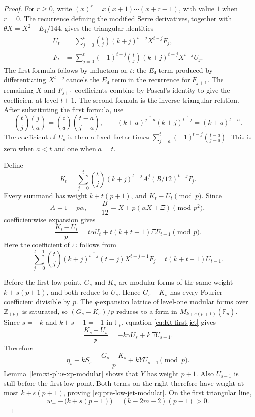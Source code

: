 \begin{proof}
For $r\geq0$, write
$(x)^{\overline r}=x(x+1)\cdots(x+r-1)$, with value $1$ when $r=0$.
The recurrence defining the modified Serre derivatives, together with
$\theta X=X^2-E_4/144$, gives the triangular identities
\begin{align}
 U_t&=\sum_{j=0}^t\binom tj
       (k+j)^{\overline{t-j}}X^{t-j}F_j,\label{eq:modified-serre-forward}\\
 F_t&=\sum_{j=0}^t(-1)^{t-j}\binom tj
       (k+j)^{\overline{t-j}}X^{t-j}U_j.\label{eq:modified-serre-inverse}
\end{align}
The first formula follows by induction on $t$: the $E_4$ term produced by
differentiating $X^{t-j}$ cancels the $E_4$ term in the recurrence for
$F_{j+1}$.  The remaining $X$ and $F_{j+1}$ coefficients combine by
Pascal's identity to give the coefficient at level $t+1$.  The second
formula is the inverse triangular relation.  After substituting the first
formula, use
\[
 \binom tj\binom ja=\binom ta\binom{t-a}{j-a},
 \qquad
 (k+a)^{\overline{j-a}}(k+j)^{\overline{t-j}}
 =(k+a)^{\overline{t-a}}.
\]
The coefficient of $U_a$ is then a fixed factor times
$\sum_{j=a}^t(-1)^{t-j}\binom{t-a}{j-a}$.  This is zero when $a<t$ and
one when $a=t$.

Define
\[
 K_t=\sum_{j=0}^t\binom tj(k+j)^{\overline{t-j}}
 A^j(B/12)^{t-j}F_j.
\]
Every summand has weight $k+t(p+1)$, and
$K_t\equiv U_t\pmod p$.  Since
\[
 A=1+p\alpha,
 \qquad \frac B{12}=X+p(\alpha X+\Xi)\pmod {p^2},
\]
coefficientwise expansion gives
\begin{equation}
\label{eq:Kt-first-jet}
 \frac{K_t-U_t}{p}
 =t\alpha U_t+t(k+t-1)\Xi U_{t-1}\pmod p.
\end{equation}
Here the coefficient of $\Xi$ follows from
\[
 \sum_{j=0}^{t-1}\binom tj(k+j)^{\overline{t-j}}
 (t-j)X^{t-j-1}F_j=t(k+t-1)U_{t-1}.
\]

Before the first low point, $G_s$ and $K_s$ are modular forms of the same
weight $k+s(p+1)$, and both reduce to $U_s$.  Hence
$G_s-K_s$ has every Fourier coefficient divisible by $p$.  The
$q$-expansion lattice of level-one modular forms over $\mathbb Z_{(p)}$ is
saturated, so $(G_s-K_s)/p$ reduces to a form in
$M_{k+s(p+1)}(\mathbb F_p)$.  Since $s=-k$ and
$k+s-1=-1$ in $\mathbb F_p$, equation \eqref{eq:Kt-first-jet} gives
\[
 \frac{K_s-U_s}{p}=-k\alpha U_s+k\Xi U_{s-1}.
\]
Therefore
\[
 \eta_s+kS_s
 =\frac{G_s-K_s}{p}+kYU_{s-1}\pmod p.
\]
Lemma~\ref{lem:xi-plus-xp-modular} shows that $Y$ has weight $p+1$.
Also $U_{s-1}$ is still before the first low point.  Both terms on the
right therefore have weight at most $k+s(p+1)$, proving
\eqref{eq:pre-low-jet-modular}.  On the first triangular line,
\[
 w_--\bigl(k+s(p+1)\bigr)=(k-2m-2)(p-1)>0.
\]


\end{proof}
